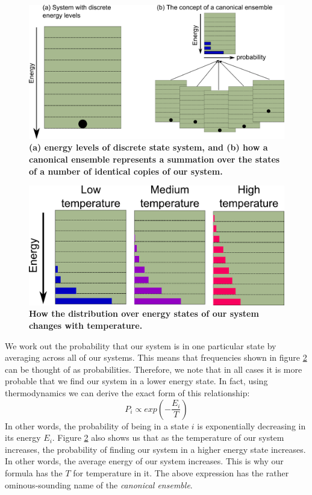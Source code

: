 \documentclass[11pt,fullpage]{book}
\begin{document}
\begin{figure}
\centerline{\includegraphics[width=1\textwidth]{HMC_canonicalEnergyLevels.pdf}}
\caption{\textbf{(a) energy levels of discrete state system, and (b) how a canonical ensemble represents a summation over the states of a number of identical copies of our system.}}\label{fig:HMC_canonicalEnergyLevels}
\end{figure}

\begin{figure}
\centerline{\includegraphics[width=1\textwidth]{HMC_temperatureEnsemble.pdf}}
\caption{\textbf{How the distribution over energy states of our system changes with temperature.}}\label{fig:HMC_temperatureEnsemble}
\end{figure}

We work out the probability that our system is in one particular state by averaging across all of our systems. This means that frequencies shown in figure \ref{fig:HMC_temperatureEnsemble} can be thought of as probabilities. Therefore, we note that in all cases it is more probable that we find our system in a lower energy state. In fact, using thermodynamics we can derive the exact form of this relationship:
%
\begin{equation}
P_i \propto exp(-\frac{E_i}{T})
\end{equation}
%
In other words, the probability of being in a state $i$ is exponentially decreasing in its energy $E_i$. Figure \ref{fig:HMC_temperatureEnsemble} also shows us that as the temperature of our system increases, the probability of finding our system in a higher energy state increases. In other words, the average energy of our system increases. This is why our formula has the $T$ for temperature in it. The above expression has the rather ominous-sounding name of the \textit{canonical ensemble}. 
\end{document}
